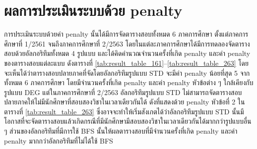 \section{ผลการประเมินระบบด้วย penalty}
การประเมินระบบด้วยค่า penalty นั้นได้มีการจัดตารางสอบทั้งหมด 6 ภาคการศึกษา ตั้งแต่ภาคการศึกษาที่ 1/2561 จนถึงภาคการศึกษาที่ 2/2563
โดยในแต่ละภาคการศึกษาได้มีการทดลองจัดตารางสอบด้วยอัลกอริทึมทั้งหมด 4 รูปแบบ และได้คิดคำนวณจำนวนครั้งที่เกิด penalty และค่า penalty ของตารางสอบแต่ละแบบ ดังตารางที่ \ref{tab:result_table_161}--\ref{tab:result_table_263}
โดยจะเห็นได้ว่าตารางสอบปลายภาคที่จัดโดยอัลกอริทึมรูปแบบ STD จะมีค่า penalty น้อยที่สุด 5 จากทั้งหมด 6 ภาคการศึกษา โดยมีจำนวนครั้งที่เกิด penalty และค่า penalty หัวข้อต่าง ๆ ใกล้เคียงกับรูปแบบ DEG
แต่ในภาคการศึกษาที่ 2/2563 อัลกอริทึมรูปแบบ STD ไม่สามารถจัดตารางสอบปลายภาคให้ไม่มีนักศึกษาที่สอบสองวิชาในเวลาเดียวกันได้ ดังที่แสดงด้วย penalty หัวข้อที่ 2 ในตารางที่ \ref{tab:result_table_263}
ซึ่งอาจจะทำให้เริ่มสังเกตได้ว่าอัลกอริทึมรูปแบบ STD นั้นมีโอกาสที่จะจัดตารางสอบแล้วเกิดกรณีที่มีนักศึกษามีสอบสองวิชาในเวลาเดียวกันได้มากกว่ารูปแบบอื่น ๆ
ส่วนของอัลกอริทึมที่มีการใช้ BFS นั้นให้ผลตารางสอบที่มีจำนวนครั้งที่เกิด penalty และค่า penalty มากกว่าอัลกอริทึมที่ไม่ได้ใช้ BFS 

